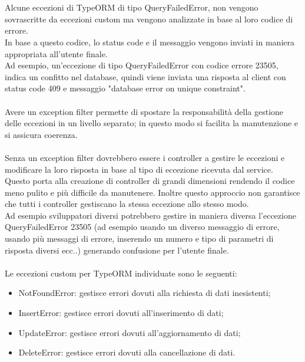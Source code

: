 \\\\
Alcune eccezioni di TypeORM di tipo QueryFailedError, non vengono sovrascritte da eccezioni custom ma 
vengono analizzate in base al loro codice di errore.
\\
In base a questo codice, lo status code e il messaggio vengono inviati in maniera appropriata all'utente finale.
\\
Ad esempio, un'eccezione di tipo QueryFailedError con codice errore 23505, indica un confitto nel database, quindi
viene inviata una risposta al client con status code 409 e messaggio "database error on unique constraint".
\\\\
Avere un exception filter permette di spostare la responsabilità della gestione delle eccezioni in un livello
separato; in questo modo si facilita la manutenzione e si assicura coerenza.
\\\\
Senza un exception filter dovrebbero essere i controller a gestire le eccezioni e modificare la loro risposta
in base al tipo di eccezione ricevuta dal service.
\\
Questo porta alla creazione di controller di grandi dimensioni rendendo il codice meno pulito e più difficile
da manutenere. Inoltre questo approccio non garantisce che tutti i controller gestiscano la stessa eccezione
allo stesso modo. 
\\
Ad esempio sviluppatori diversi potrebbero gestire in maniera diversa l'eccezione QueryFailedError 23505 (ad esempio usando
un diverso messaggio di errore,
usando più messaggi di errore, inserendo un numero e tipo di parametri di risposta diversi ecc..)
generando confusione per l'utente finale.
\\\\
Le eccezioni custom per TypeORM individuate sono le seguenti:
\begin{itemize}
    \item NotFoundError: gestisce errori dovuti alla richiesta di dati inesistenti;
    \item InsertError: gestisce errori dovuti all'inserimento di dati;
    \item UpdateError: gestisce errori dovuti all'aggiornamento di dati;
    \item DeleteError: gestisce errori dovuti alla cancellazione di dati.
\end{itemize}
\leavevmode\newline


